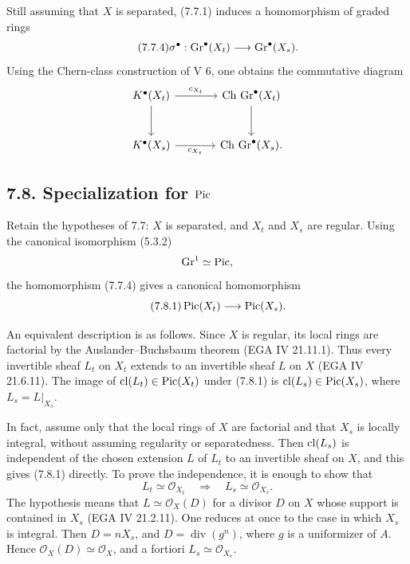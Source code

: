 Still assuming that $X$ is separated, (7.7.1) induces a homomorphism of
graded rings
\begin{equation}\tag{7.7.4}
\sigma^\bullet:\operatorname{Gr}^\bullet(X_t)\longrightarrow\operatorname{Gr}^\bullet(X_s).
\end{equation}
Using the Chern-class construction of V 6, one obtains the commutative
diagram
\[
\begin{tikzcd}[column sep=large,row sep=large]
K^\bullet(X_t) \arrow[r,"c_{X_t}"] \arrow[d] &
\Ch\,\Gr^\bullet(X_t) \arrow[d]\\
K^\bullet(X_s) \arrow[r,"c_{X_s}"'] &
\Ch\,\Gr^\bullet(X_s).
\end{tikzcd}
\]

\subsection*{7.8. Specialization for $\operatorname{Pic}$}
Retain the hypotheses of 7.7: $X$ is separated, and $X_t$ and $X_s$ are
regular. Using the canonical isomorphism (5.3.2)
\[
\operatorname{Gr}^1\simeq\operatorname{Pic},
\]
the homomorphism (7.7.4) gives a canonical homomorphism
\begin{equation}\tag{7.8.1}
\operatorname{Pic}(X_t)\longrightarrow\operatorname{Pic}(X_s).
\end{equation}

An equivalent description is as follows. Since $X$ is regular, its local
rings are factorial by the Auslander--Buchsbaum theorem (EGA IV 21.11.1).
Thus every invertible sheaf $L_t$ on $X_t$ extends to an invertible sheaf
$L$ on $X$ (EGA IV 21.6.11). The image of
$\operatorname{cl}(L_t)\in\operatorname{Pic}(X_t)$ under (7.8.1) is
$\operatorname{cl}(L_s)\in\operatorname{Pic}(X_s)$, where $L_s=L|_{X_s}$.

In fact, assume only that the local rings of $X$ are factorial and that
$X_s$ is locally integral, without assuming regularity or separatedness.
Then $\operatorname{cl}(L_s)$ is independent of the chosen extension $L$ of $L_t$ to an
invertible sheaf on $X$, and this gives (7.8.1) directly. To prove the
independence, it is enough to show that
\[
L_t\simeq\mathcal O_{X_t}\quad\Longrightarrow\quad
L_s\simeq\mathcal O_{X_s}.
\]
The hypothesis means that $L\simeq\mathcal O_X(D)$ for a divisor $D$ on
$X$ whose support is contained in $X_s$ (EGA IV 21.2.11). One reduces at
once to the case in which $X_s$ is integral. Then $D=nX_s$, and
$D=\operatorname{div}(g^n)$, where $g$ is a uniformizer of $A$. Hence
$\mathcal O_X(D)\simeq\mathcal O_X$, and a fortiori
$L_s\simeq\mathcal O_{X_s}$.

